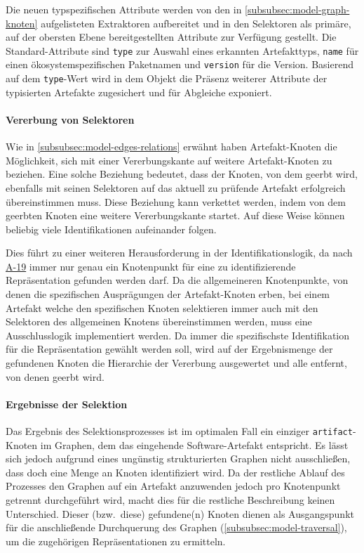 Die neuen typspezifischen Attribute werden von den in \autoref{subsubsec:model-graph-knoten} aufgelisteten Extraktoren aufbereitet und in den Selektoren als primäre, auf der obersten Ebene bereitgestellten Attribute zur Verfügung gestellt.
Die Standard-Attribute sind \texttt{type} zur Auswahl eines erkannten Artefakttyps, \texttt{name} für einen ökosystemspezifischen Paketnamen und \texttt{version} für die Version.
Basierend auf dem \texttt{type}-Wert wird in dem Objekt die Präsenz weiterer Attribute der typisierten Artefakte zugesichert und für Abgleiche exponiert.

\paragraph{Vererbung von Selektoren}

Wie in \autoref{subsubsec:model-edges-relations} erwähnt haben Artefakt-Knoten die Möglichkeit, sich mit einer Vererbungskante auf weitere Artefakt-Knoten zu beziehen.
Eine solche Beziehung bedeutet, dass der Knoten, von dem geerbt wird, ebenfalls mit seinen Selektoren auf das aktuell zu prüfende Artefakt erfolgreich übereinstimmen muss.
Diese Beziehung kann verkettet werden, indem von dem geerbten Knoten eine weitere Vererbungskante startet.
Auf diese Weise können beliebig viele Identifikationen aufeinander folgen.

Dies führt zu einer weiteren Herausforderung in der Identifikationslogik, da nach \hyperref[subsec:req-graph-inner-consistency]{A-19} immer nur genau ein Knotenpunkt für eine zu identifizierende Repräsentation gefunden werden darf.
Da die allgemeineren Knotenpunkte, von denen die spezifischen Ausprägungen der Artefakt-Knoten erben, bei einem Artefakt welche den spezifischen Knoten selektieren immer auch mit den Selektoren des allgemeinen Knotens übereinstimmen werden, muss eine Ausschlusslogik implementiert werden.
Da immer die spezifischste Identifikation für die Repräsentation gewählt werden soll, wird auf der Ergebnismenge der gefundenen Knoten die Hierarchie der Vererbung ausgewertet und alle entfernt, von denen geerbt wird.

\paragraph{Ergebnisse der Selektion}

Das Ergebnis des Selektionsprozesses ist im optimalen Fall ein einziger \texttt{artifact}-Knoten im Graphen, dem das eingehende Software-Artefakt entspricht.
Es lässt sich jedoch aufgrund eines ungünstig strukturierten Graphen nicht ausschließen, dass doch eine Menge an Knoten identifiziert wird.
Da der restliche Ablauf des Prozesses den Graphen auf ein Artefakt anzuwenden jedoch pro Knotenpunkt getrennt durchgeführt wird, macht dies für die restliche Beschreibung keinen Unterschied.
Dieser (bzw.\ diese) gefundene(n) Knoten dienen als Ausgangspunkt für die anschließende Durchquerung des Graphen (\autoref{subsubsec:model-traversal}), um die zugehörigen Repräsentationen zu ermitteln.

